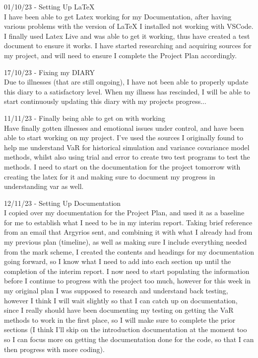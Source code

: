 \documentclass{article}
\begin{document}
01/10/23 - Setting Up LaTeX\\
I have been able to get Latex working for my Documentation, after having various problems with the version of LaTeX I installed not working with VSCode. I finally used Latex Live and was able to get it working, thus have created a test document to ensure it works. I have started researching and acquiring sources for my project, and will need to ensure I complete the Project Plan accordingly.\\\vspace{0.3cm}

17/10/23 - Fixing my DIARY\\
Due to illnesses (that are still ongoing), I have not been able to properly update this diary to a satisfactory level. When my illness has rescinded, I will be able to start continuously updating this diary with my projects progress...\\\vspace{0.3cm}

11/11/23 - Finally being able to get on with working\\
Have finally gotten illnesses and emotional issues under control, and have been able to start working on my project. I've used the sources I originally found to help me understand VaR for historical simulation and variance covariance model methods, whilst also using trial and error to create two test programs to test the methods. I need to start on the documentation for the project tomorrow with creating the latex for it and making sure to document my progress in understanding var as well.\\\vspace{0.3cm}

12/11/23 - Setting Up Documentation\\
I copied over my documentation for the Project Plan, and used it as a baseline for me to establish what I need to be in my interim report. Taking brief reference from an email that Argyrios sent, and combining it with what I already had from my previous plan (timeline), as well as making sure I include everything needed from the mark scheme, I created the contents and headings for my documentation going forward, so I know what I need to add into each section up until the completion of the interim report. I now need to start populating the information before I continue to progress with the project too much, however for this week in my original plan I was supposed to research and understand back testing, however I think I will wait slightly so that I can catch up on documentation, since I really should have been documenting my testing on getting the VaR methods to work in the first place, so I will make sure to complete the prior sections (I think I'll skip on the introduction documentation at the moment too so I can focus more on getting the documentation done for the code, so that I can then progress with more coding).\\\vspace{0.3cm}
\end{document}
